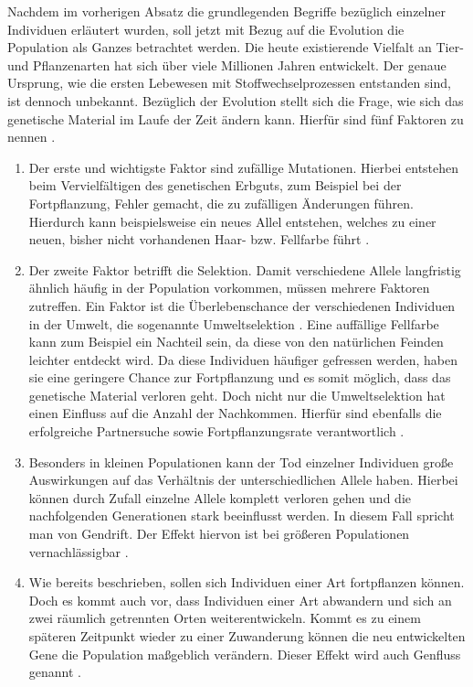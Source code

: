 Nachdem im vorherigen Absatz die grundlegenden Begriffe bezüglich einzelner Individuen erläutert wurden, soll jetzt mit Bezug auf die Evolution die Population als Ganzes betrachtet werden. Die heute existierende Vielfalt an Tier- und Pflanzenarten hat sich über viele Millionen Jahren entwickelt. Der genaue Ursprung, wie die ersten Lebewesen mit Stoffwechselprozessen entstanden sind, ist dennoch unbekannt. Bezüglich der Evolution stellt sich die Frage, wie sich das genetische Material im Laufe der Zeit ändern kann. Hierfür sind fünf Faktoren zu nennen \cite{weicker2015evolutionare}.
\begin{enumerate}
	\item Der erste und wichtigste Faktor sind zufällige Mutationen. Hierbei entstehen beim Vervielfältigen des genetischen Erbguts, zum Beispiel bei der Fortpflanzung, Fehler gemacht, die zu zufälligen Änderungen führen. Hierdurch kann beispielsweise ein neues Allel entstehen, welches zu einer neuen, bisher nicht vorhandenen Haar- bzw. Fellfarbe führt \cite{weicker2015evolutionare}. 
	
	\item Der zweite Faktor betrifft die Selektion. Damit verschiedene Allele langfristig ähnlich häufig in der Population vorkommen, müssen mehrere Faktoren zutreffen. Ein Faktor ist die Überlebenschance der verschiedenen Individuen in der Umwelt, die sogenannte Umweltselektion \cite{weicker2015evolutionare}. Eine auffällige Fellfarbe kann zum Beispiel ein Nachteil sein, da diese von den natürlichen Feinden leichter entdeckt wird. Da diese Individuen häufiger gefressen werden, haben sie eine geringere Chance zur Fortpflanzung und es somit möglich, dass das genetische Material verloren geht. Doch nicht nur die Umweltselektion hat einen Einfluss auf die Anzahl der Nachkommen. Hierfür sind ebenfalls die erfolgreiche Partnersuche sowie Fortpflanzungsrate verantwortlich \cite{weicker2015evolutionare}.
	
	\item Besonders in kleinen Populationen kann der Tod einzelner Individuen große Auswirkungen auf das Verhältnis der unterschiedlichen Allele haben. Hierbei können durch Zufall einzelne Allele komplett verloren gehen und die nachfolgenden Generationen stark beeinflusst werden. In diesem Fall spricht man von Gendrift. Der Effekt hiervon ist bei größeren Populationen vernachlässigbar \cite{weicker2015evolutionare}.
	
	\item Wie bereits beschrieben, sollen sich Individuen einer Art fortpflanzen können. Doch es kommt auch vor, dass Individuen einer Art abwandern und sich an zwei räumlich getrennten Orten weiterentwickeln. Kommt es zu einem späteren Zeitpunkt wieder zu einer Zuwanderung können die neu entwickelten Gene die Population maßgeblich verändern. Dieser Effekt wird auch Genfluss genannt \cite{weicker2015evolutionare}.
	

\end{enumerate}
